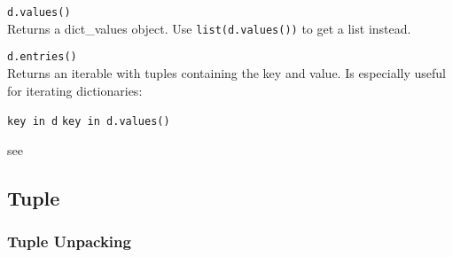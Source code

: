 \begin{itemize}
         \texttt{d.values()} \\
        Returns a dict\_values object. Use \texttt{list(d.values())} to get a list
        instead.
        
         \texttt{d.entries()} \\
        Returns an iterable with tuples containing the key and value.
        Is especially useful for iterating dictionaries:


        \begin{itemize}
             \texttt{key in d}
             \texttt{key in d.values()}
        \end{itemize}

         see 

    \end{itemize}


  \subsection{Tuple}

    \subsubsection{Tuple Unpacking}
    